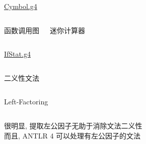 
\begin{frame}{}
  \begin{center}
    {\Large \href{https://github.com/courses-at-nju-by-hfwei/compilers-antlr/blob/main/src/main/antlr/cymbol/Cymbol.g4}{Cymbol.g4}}

    \vspace{0.30cm}
    \begin{columns}
        \begin{center}
          函数调用图
        \end{center}
        \begin{center}
          迷你计算器
        \end{center}
    \end{columns}
  \end{center}
\end{frame}

\begin{frame}{}
  \begin{center}
    {\Large \href{https://github.com/courses-at-nju-by-hfwei/compilers-antlr/blob/main/src/main/antlr/if-stat/IfStat.g4}{IfStat.g4}}
  \end{center}

  \begin{columns}
    \begin{center}
      二义性文法
    \end{center}

    \pause
    \vspace{0.30cm}
  \end{columns}
\end{frame}

\begin{frame}{}
  \begin{center}
    Left-Factoring

    \vspace{0.30cm}
    \begin{columns}
    \end{columns}

    \vspace{0.80cm}
    很明显, 提取左公因子无助于消除文法二义性 \\[12pt]
    而且, ANTLR 4 可以处理有左公因子的文法
  \end{center}
\end{frame}

